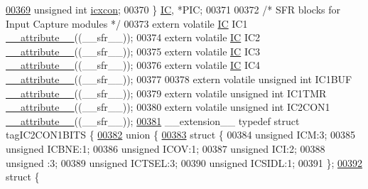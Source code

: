\begin{DoxyCode}
\hypertarget{a00009_source_l00369}{}\hyperlink{a00008_a5fdcc8582f85c71d97c3f0231cbad23f}{00369}         \textcolor{keywordtype}{unsigned} \textcolor{keywordtype}{int} \hyperlink{a00008_a5fdcc8582f85c71d97c3f0231cbad23f}{icxcon};
00370 \} \hyperlink{a00008_d7/d9f/a00454}{IC}, *PIC;
00371 
00372 \textcolor{comment}{/* SFR blocks for Input Capture modules */}
00373 \textcolor{keyword}{extern} \textcolor{keyword}{volatile} \hyperlink{a00008_d7/d9f/a00454}{IC} IC1 \hyperlink{a00009_a493c46f03454991ccc5aa7a6e1dfb2a7}{\_\_attribute\_\_}((\_\_sfr\_\_));
00374 \textcolor{keyword}{extern} \textcolor{keyword}{volatile} \hyperlink{a00008_d7/d9f/a00454}{IC} IC2 \hyperlink{a00009_a493c46f03454991ccc5aa7a6e1dfb2a7}{\_\_attribute\_\_}((\_\_sfr\_\_));
00375 \textcolor{keyword}{extern} \textcolor{keyword}{volatile} \hyperlink{a00008_d7/d9f/a00454}{IC} IC3 \hyperlink{a00009_a493c46f03454991ccc5aa7a6e1dfb2a7}{\_\_attribute\_\_}((\_\_sfr\_\_));
00376 \textcolor{keyword}{extern} \textcolor{keyword}{volatile} \hyperlink{a00008_d7/d9f/a00454}{IC} IC4 \hyperlink{a00009_a493c46f03454991ccc5aa7a6e1dfb2a7}{\_\_attribute\_\_}((\_\_sfr\_\_));
00377 
00378 \textcolor{keyword}{extern} \textcolor{keyword}{volatile} \textcolor{keywordtype}{unsigned} \textcolor{keywordtype}{int}  IC1BUF \hyperlink{a00009_a493c46f03454991ccc5aa7a6e1dfb2a7}{\_\_attribute\_\_}((\_\_sfr\_\_));
00379 \textcolor{keyword}{extern} \textcolor{keyword}{volatile} \textcolor{keywordtype}{unsigned} \textcolor{keywordtype}{int}  IC1TMR \hyperlink{a00009_a493c46f03454991ccc5aa7a6e1dfb2a7}{\_\_attribute\_\_}((\_\_sfr\_\_));
00380 \textcolor{keyword}{extern} \textcolor{keyword}{volatile} \textcolor{keywordtype}{unsigned} \textcolor{keywordtype}{int}  IC2CON1 \hyperlink{a00009_a493c46f03454991ccc5aa7a6e1dfb2a7}{\_\_attribute\_\_}((\_\_sfr\_\_));
\hypertarget{a00009_source_l00381}{}\hyperlink{a00008}{00381} \_\_extension\_\_ \textcolor{keyword}{typedef} \textcolor{keyword}{struct }tagIC2CON1BITS \{
\hypertarget{a00009_source_l00382}{}\hyperlink{a00009}{00382}   \textcolor{keyword}{union }\{
\hypertarget{a00009_source_l00383}{}\hyperlink{a00009}{00383}     \textcolor{keyword}{struct }\{
00384       \textcolor{keywordtype}{unsigned} ICM:3;
00385       \textcolor{keywordtype}{unsigned} ICBNE:1;
00386       \textcolor{keywordtype}{unsigned} ICOV:1;
00387       \textcolor{keywordtype}{unsigned} ICI:2;
00388       \textcolor{keywordtype}{unsigned} :3;
00389       \textcolor{keywordtype}{unsigned} ICTSEL:3;
00390       \textcolor{keywordtype}{unsigned} ICSIDL:1;
00391     \};
\hypertarget{a00009_source_l00392}{}\hyperlink{a00009}{00392}     \textcolor{keyword}{struct }\{

\end{DoxyCode}
